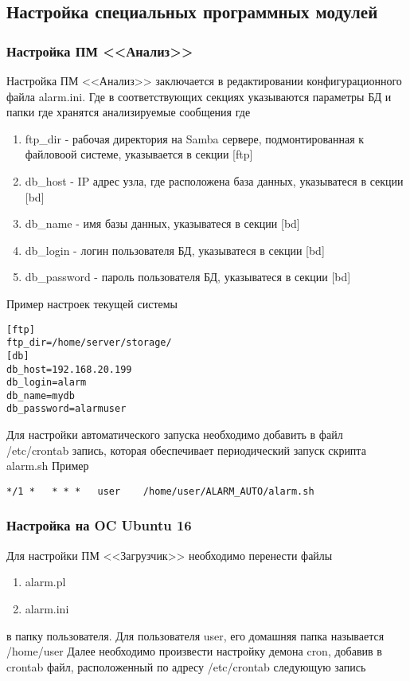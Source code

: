 \documentclass[12pt]{article}[a4paper,14pt,russian]
\begin{document}
	\subsection {Настройка специальных программных модулей}
	\subsubsection{Настройка ПМ <<Анализ>>}
	Настройка ПМ <<Анализ>> заключается в редактировании конфигурационного файла alarm.ini. Где в соответствующих секциях указываются параметры БД и папки где хранятся анализируемые сообщения 
	где
	\begin{enumerate}
		\item ftp\_dir - рабочая директория на Samba сервере, подмонтированная
		 к файловоой системе, указывается в секции [ftp]
		 \item db\_host - IP адрес узла, где расположена база данных, указыватеся в секции [bd]
		 \item db\_name - имя базы данных, указыватеся в секции [bd]
		 \item db\_login - логин пользователя БД, указыватеся в секции [bd]
		 \item db\_password - пароль пользователя БД, указыватеся в секции [bd]
	\end{enumerate}
	
	Пример настроек текущей системы
\begin{verbatim} 
[ftp]
ftp_dir=/home/server/storage/
[db]
db_host=192.168.20.199
db_login=alarm
db_name=mydb
db_password=alarmuser
\end{verbatim}
Для настройки автоматического запуска необходимо добавить в файл /etc/crontab
запись, которая обеспечивает периодический запуск скрипта alarm.sh
Пример

\begin{verbatim}
*/1 *   * * *   user    /home/user/ALARM_AUTO/alarm.sh
\end{verbatim}

	\subsubsection{Настройка на OC Ubuntu 16}
	Для настройки ПМ <<Загрузчик>> необходимо перенести файлы
	\begin{enumerate}
	\item alarm.pl
	\item alarm.ini
	\end{enumerate}
	в папку пользователя. Для пользователя user, его домашняя папка называется /home/user
	Далее необходимо произвести настройку демона cron, добавив в crontab файл, расположенный по адресу 
	/etc/crontab
	следующую запись
	
\end{document}
